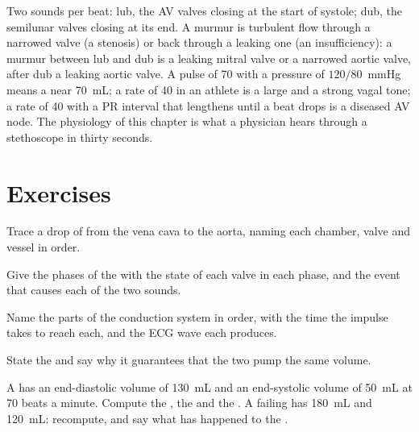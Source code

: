 \begin{example}\label{ex:b2:heart:reading}
Two sounds per beat: lub, the AV valves closing at the start of
systole; dub, the semilunar valves closing at its end. A murmur is
turbulent flow through a narrowed valve (a stenosis) or back
through a leaking one (an insufficiency): a murmur between lub and
dub is a leaking mitral valve or a narrowed aortic valve, after dub
a leaking aortic valve. A pulse of 70 with a  pressure of
$120/80$~mmHg means a  near \qty{70}{mL};
a rate of 40 in an athlete is a large  and a strong
vagal tone; a rate of 40 with a PR interval that lengthens until a
beat drops is a diseased AV node. The physiology of this chapter is
what a physician hears through a stethoscope in thirty seconds.
\end{example}

\section{Exercises}

\begin{exercise}[$\star$]\label{exo:b2:heart:1}
Trace a drop of  from the vena cava to the aorta, naming each
chamber, valve and vessel in order.
\end{exercise}

\begin{exercise}[$\star$]\label{exo:b2:heart:2}
Give the phases of the  with the state of each valve
in each phase, and the event that causes each of the two 
sounds.
\end{exercise}

\begin{exercise}[$\star$]\label{exo:b2:heart:3}
Name the parts of the conduction system in order, with the time the
impulse takes to reach each, and the ECG wave each produces.
\end{exercise}

\begin{exercise}[$\star$]\label{exo:b2:heart:4}
State the  and say why it guarantees that the two
 pump the same volume.
\end{exercise}

\begin{exercise}[$\star\star$]\label{exo:b2:heart:5}
A  has an end-diastolic volume of \qty{130}{mL} and an
end-systolic volume of \qty{50}{mL} at 70 beats a minute. Compute
the , the  and the . A
failing  has \qty{180}{mL} and \qty{120}{mL}: recompute, and say
what has happened to the .
\end{exercise}

